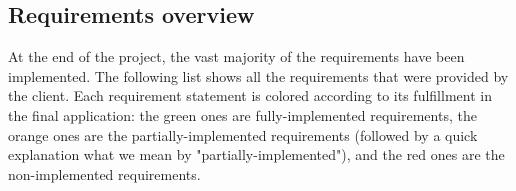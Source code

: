 \subsection{Requirements overview}
\label{Requirements overview}

At the end of the project, the vast majority of the requirements have been
implemented. The following list shows all the requirements that were provided
by the client. Each requirement statement is colored according to its
fulfillment in the final application: the green ones are fully-implemented
requirements, the orange ones are the partially-implemented requirements
(followed by a quick explanation what we mean by "partially-implemented"),
and the red ones are the non-implemented requirements. \newline
